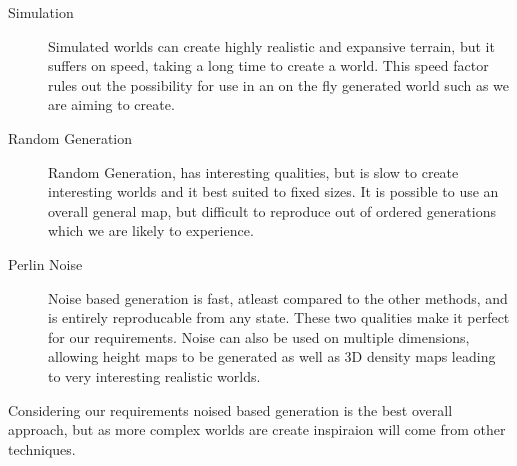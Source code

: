 \begin{description}
\item[Simulation]
Simulated worlds can create highly realistic
and expansive terrain, but it suffers on speed, taking a long time to create a 
world. This speed factor rules out the possibility for use in an on the fly 
generated world such as we are aiming to create. 

\item[Random Generation] Random Generation, has 
interesting qualities, but is slow to create interesting worlds and it best
suited to fixed sizes. It is possible to use an overall general map, but 
difficult to reproduce out of ordered generations which we are likely to
experience. 

\item[Perlin Noise] Noise based generation is fast, atleast compared to the other
methods, and is entirely reproducable from any state. These two qualities make it
perfect for our requirements. Noise can also be used on multiple dimensions, 
allowing height maps to be generated as well as 3D density maps leading to very
interesting realistic worlds.
\end{description}

Considering our requirements noised based generation is the best overall 
approach,
but as more complex worlds are create inspiraion will come from other 
techniques.\\

